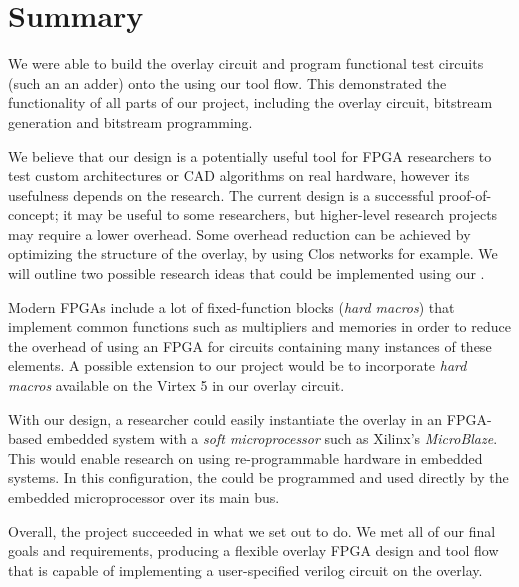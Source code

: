 \section{Summary} %

We were able to build the overlay circuit and program functional test circuits (such an an adder) onto the \overlay using our tool flow.
This demonstrated the functionality of all parts of our project, including the overlay circuit, bitstream generation and bitstream programming.

We believe that our design is a potentially useful tool for FPGA researchers to test custom architectures or CAD algorithms on real hardware, however its usefulness depends on the research.
The current design is a successful proof-of-concept; it may be useful to some researchers, but higher-level research projects may require a lower overhead.
Some overhead reduction can be achieved by optimizing the structure of the overlay, by using Clos networks for example.
We will outline two possible research ideas that could be implemented using our \overlay.

Modern FPGAs include a lot of fixed-function blocks (\emph{hard macros}) that implement common functions such as multipliers and memories in order to reduce the overhead of using an FPGA for circuits containing many instances of these elements.
A possible extension to our project would be to incorporate \emph{hard macros} available on the Virtex 5 in our overlay circuit.

With our \overlay design, a researcher could easily instantiate the overlay in an FPGA-based embedded system with a \emph{soft microprocessor} such as Xilinx's \emph{MicroBlaze}.
This would enable research on using re-programmable hardware in embedded systems.
In this configuration, the \overlay could be programmed and used directly by the embedded microprocessor over its main bus.

Overall, the project succeeded in what we set out to do.
We met all of our final goals and requirements, producing a flexible overlay FPGA design and tool flow that is capable of implementing a user-specified verilog circuit on the overlay.



